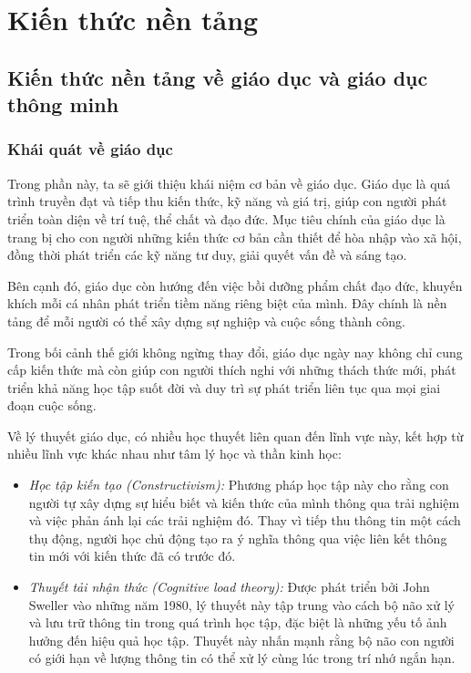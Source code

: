 \chapter{Kiến thức nền tảng}
\section{Kiến thức nền tảng về giáo dục và giáo dục thông minh}
\subsection{Khái quát về giáo dục}
\par Trong phần này, ta sẽ giới thiệu khái niệm cơ bản về giáo dục. Giáo dục là quá trình truyền đạt và tiếp thu kiến thức, kỹ năng và giá trị, giúp con người phát triển toàn diện về trí tuệ, thể chất và đạo đức. Mục tiêu chính của giáo dục là trang bị cho con người những kiến thức cơ bản cần thiết để hòa nhập vào xã hội, đồng thời phát triển các kỹ năng tư duy, giải quyết vấn đề và sáng tạo.

\par Bên cạnh đó, giáo dục còn hướng đến việc bồi dưỡng phẩm chất đạo đức, khuyến khích mỗi cá nhân phát triển tiềm năng riêng biệt của mình. Đây chính là nền tảng để mỗi người có thể xây dựng sự nghiệp và cuộc sống thành công.

\par Trong bối cảnh thế giới không ngừng thay đổi, giáo dục ngày nay không chỉ cung cấp kiến thức mà còn giúp con người thích nghi với những thách thức mới, phát triển khả năng học tập suốt đời và duy trì sự phát triển liên tục qua mọi giai đoạn cuộc sống.

\par Về lý thuyết giáo dục, có nhiều học thuyết liên quan đến lĩnh vực này, kết hợp từ nhiều lĩnh vực khác nhau như tâm lý học và thần kinh học:
\begin{itemize}
\item \emph{Học tập kiến tạo (Constructivism): }Phương pháp học tập này cho rằng con người tự xây dựng sự hiểu biết và kiến thức của mình thông qua trải nghiệm và việc phản ánh lại các trải nghiệm đó. Thay vì tiếp thu thông tin một cách thụ động, người học chủ động tạo ra ý nghĩa thông qua việc liên kết thông tin mới với kiến thức đã có trước đó.
\item \emph{Thuyết tải nhận thức (Cognitive load theory): }Được phát triển bởi John Sweller vào những năm 1980, lý thuyết này tập trung vào cách bộ não xử lý và lưu trữ thông tin trong quá trình học tập, đặc biệt là những yếu tố ảnh hưởng đến hiệu quả học tập. Thuyết này nhấn mạnh rằng bộ não con người có giới hạn về lượng thông tin có thể xử lý cùng lúc trong trí nhớ ngắn hạn.
\end{itemize}
